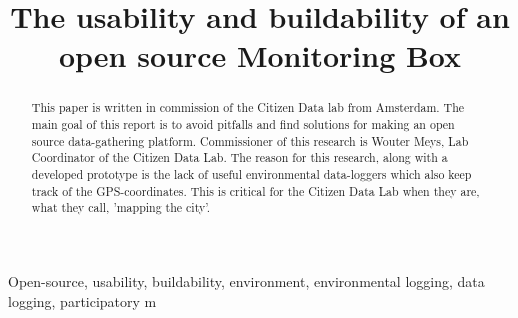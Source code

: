 \documentclass[conference]{IEEEtran}
\begin{document}
\title{The usability and buildability of an open source Monitoring Box}

\author{
	\and
		\and
		}
\maketitle	

\begin{abstract}
This paper is written in commission of the Citizen Data lab from Amsterdam. The main goal of this report is to avoid pitfalls and find solutions for making an open source data-gathering platform. Commissioner of this research is Wouter Meys, Lab Coordinator of the Citizen Data Lab. The reason for this research, along with a developed prototype is the lack of useful environmental data-loggers which also keep track of the GPS-coordinates. This is critical for the Citizen Data Lab when they are, what they call, 'mapping the city'. \\

\end{abstract}

\begin{IEEEkeywords}
Open-source, usability, buildability, environment, environmental logging, data logging, participatory m%
\end{IEEEkeywords}
\end{document}
